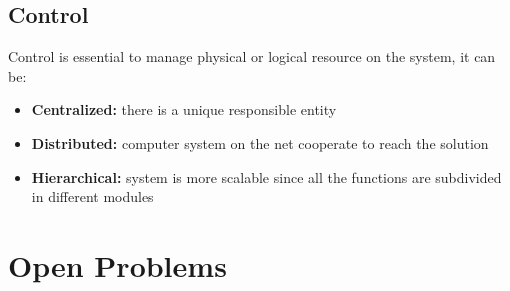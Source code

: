 \subsection{Control}
Control is essential to manage physical or logical resource on the system, it can be:
\begin{itemize}
    \item \textbf{Centralized:} there is a unique responsible entity
    \item \textbf{Distributed:} computer system on the net cooperate to reach the solution
    \item \textbf{Hierarchical:} system is more scalable since all the functions are subdivided in different modules
\end{itemize}

\section{Open Problems}
